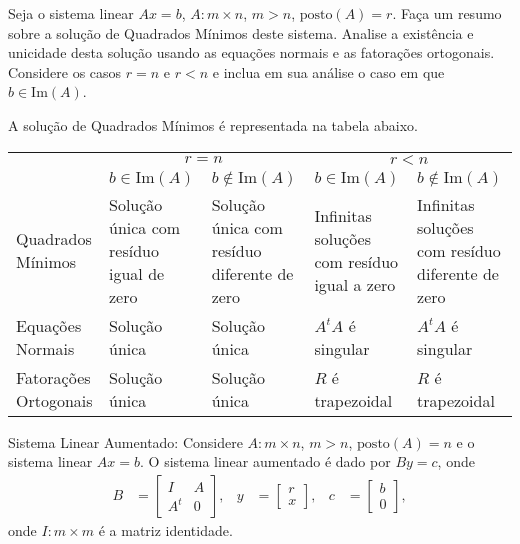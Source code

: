 \begin{questions}
    \question Seja o sistema linear $A x = b$, $A : m \times n$, $m > n$, $\text{posto}(A) = r$. Fa\c{c}a um resumo sobre a solu\c{c}\~{a}o de Quadrados M\'{i}nimos deste sistema. Analise a exist\^{e}ncia e unicidade desta solu\c{c}\~{a}o usando as equa\c{c}\~{o}es normais e as fatora\c{c}\~{o}es ortogonais. Considere os casos $r = n$ e $r < n$ e inclua em sua an\'{a}lise o caso em que $b \in \text{Im}(A)$.
    \begin{solution}
        A solu\c{c}\~{a}o de Quadrados M\'{i}nimos \'{e} representada na tabela abaixo.
        \begin{center}
            \begin{tabular}{|p{}|p{}|p{}|p{}|p{}|}
                \cline{2-5}
                \multicolumn{1}{c|}{} & \multicolumn{2}{|c|}{$r = n$} & \multicolumn{2}{|c|}{$r < n$} \\ \cline{2-5}
                \multicolumn{1}{c|}{} & $b \in \text{Im}(A)$ & $b \not\in \text{Im}(A)$ & $b \in \text{Im}(A)$ & $b \not\in \text{Im}(A)$ \\ \hline
                Quadrados M\'{i}nimos & Solu\c{c}\~{a}o \'{u}nica com res\'{i}duo igual de zero & Solu\c{c}\~{a}o \'{u}nica com res\'{i}duo diferente de zero & Infinitas solu\c{c}\~{o}es com res\'{i}duo igual a zero & Infinitas solu\c{c}\~{o}es com res\'{i}duo diferente de zero \\ \hline
                Equa\c{c}\~{o}es Normais & Solu\c{c}\~{a}o \'{u}nica & Solu\c{c}\~{a}o \'{u}nica & $A^t A$ \'{e} singular & $A^t A$ \'{e} singular \\ \hline
                Fatora\c{c}\~{o}es Ortogonais & Solu\c{c}\~{a}o \'{u}nica & Solu\c{c}\~{a}o \'{u}nica & $R$ \'{e} trapezoidal & $R$ \'{e} trapezoidal \\ \hline
            \end{tabular}
        \end{center}
    \end{solution}

    \question Sistema Linear Aumentado: Considere $A : m \times n$, $m > n$, $\text{posto}(A) = n$ e o sistema linear $A x = b$. O sistema linear aumentado \'{e} dado por $B y = c$, onde
    \begin{align*}
        B &= \begin{bmatrix}
            I & A \\
            A^t & 0
        \end{bmatrix}, & y &= \begin{bmatrix}
            r \\
            x
        \end{bmatrix}, & c &= \begin{bmatrix}
            b \\
            0
        \end{bmatrix},
    \end{align*}
    onde $I : m \times m$ \'{e} a matriz identidade.


\end{questions}
